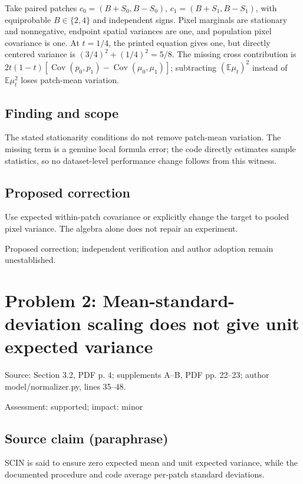 \documentclass[11pt]{article}
\begin{document}
Take paired patches \(c_0=(B+S_0,B-S_0)\), \(c_1=(B+S_1,B-S_1)\), with equiprobable \(B\in\{2,4\}\) and independent signs. Pixel marginals are stationary and nonnegative, endpoint spatial variances are one, and population pixel covariance is one. At \(t=1/4\), the printed equation gives one, but directly centered variance is \((3/4)^2+(1/4)^2=5/8\). The missing cross contribution is \(2t(1-t)[\operatorname{Cov}(p_0,p_1)-\operatorname{Cov}(\mu_0,\mu_1)]\); subtracting \((\mathbb E\mu_t)^2\) instead of \(\mathbb E\mu_t^2\) loses patch-mean variation.

\subsection*{Finding and scope}

The stated stationarity conditions do not remove patch-mean variation. The missing term is a genuine local formula error; the code directly estimates sample statistics, so no dataset-level performance change follows from this witness.

\subsection*{Proposed correction}

Use expected within-patch covariance or explicitly change the target to pooled pixel variance. The algebra alone does not repair an experiment.

Proposed correction; independent verification and author adoption remain unestablished.

\section*{Problem 2: Mean-standard-deviation scaling does not give unit expected variance}

Source: Section 3.2, PDF p. 4; supplements A–B, PDF pp. 22–23; author model/normalizer.py, lines 35–48.

Assessment: supported; impact: minor

\subsection*{Source claim (paraphrase)}

SCIN is said to ensure zero expected mean and unit expected variance, while the documented procedure and code average per-patch standard deviations.
\end{document}

